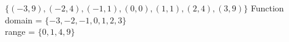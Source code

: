 {$ \{(-3, 9), (-2, 4), (-1, 1), (0, 0), (1, 1), (2, 4), (3, 9)\}$}
{Function \\ domain = $\{-3, -2, -1, 0, 1, 2 ,3\}$ \\ range = $\{0, 1, 4, 9\}$}